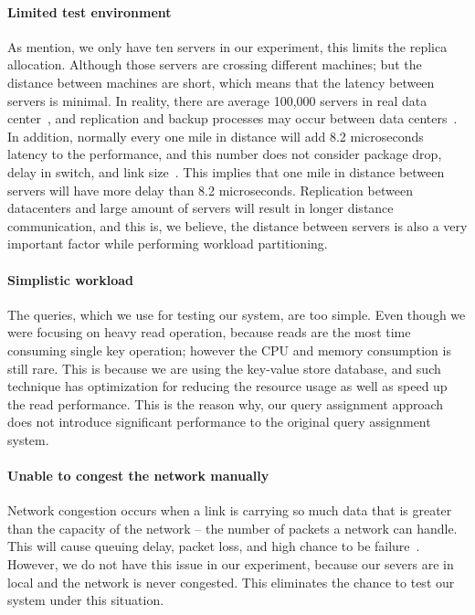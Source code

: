 \paragraph{Limited test environment}
As mention, we only have ten servers in our experiment, this limits the replica allocation. Although those servers are crossing different machines; but the distance between machines are short, which means that the latency between servers is minimal. In reality, there are average 100,000 servers in real data center~\cite{Guo:2010:SDC:1921168.1921188}, and replication and backup processes may occur between data centers~\cite{F5-Accelerate}. In addition, normally every one mile in distance will add 8.2 microseconds latency to the performance, and this number does not consider package drop, delay in switch, and link size~\cite{Cisco-Latency}. This implies that one mile in distance between servers will have more delay than 8.2 microseconds. Replication between datacenters and large amount of servers will result in longer distance communication, and this is, we believe, the distance between servers is also a very important factor while performing workload partitioning.
 
\paragraph{Simplistic workload}
The queries, which we use for testing our system, are too simple. Even though we were focusing on heavy read operation, because reads are the most time consuming single key operation; however the CPU and memory consumption is still rare. This is because we are using the key-value store database, and such technique has optimization for reducing the resource usage as well as speed up the read performance. This is the reason why, our query assignment approach does not introduce significant performance to the original query assignment system.
 
\paragraph{Unable to congest the network manually}
Network congestion occurs when a link is carrying so much data that is greater than the capacity of the network – the number of packets a network can handle. This will cause queuing delay, packet loss, and high chance to be failure~\cite{103559}. However, we do not have this issue in our experiment, because our severs are in local and the network is never congested. This eliminates the chance to test our system under this situation.
 
